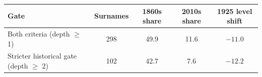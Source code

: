 \begin{tabular}{lcccc}
\toprule
Gate & Surnames & 1860s share & 2010s share & 1925 level shift \\
\midrule
Both criteria (depth $\geq$ 1) & 298 & 49.9 & 11.6 & $-11.0$ \\
Stricter historical gate (depth $\geq$ 2) & 102 & 42.7 & 7.6 & $-12.2$ \\
\bottomrule
\end{tabular}
